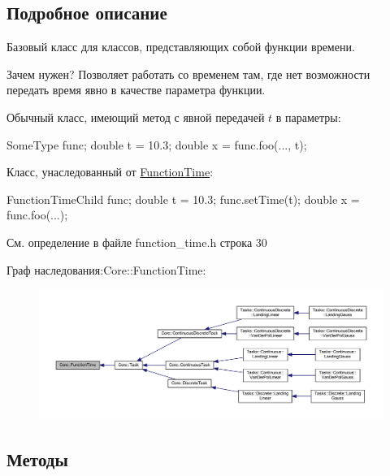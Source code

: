 \subsection{Подробное описание}
Базовый класс для классов, представляющих собой функции времени. 

Зачем нужен? Позволяет работать со временем там, где нет возможности передать время явно в качестве параметра функции.

Обычный класс, имеющий метод с явной передачей $t$ в параметры\+: 
\begin{DoxyCode}
SomeType func;
\textcolor{keywordtype}{double} t = 10.3;
\textcolor{keywordtype}{double} x = func.foo(..., t);
\end{DoxyCode}
 Класс, унаследованный от \hyperlink{class_core_1_1_function_time}{Function\+Time}\+: 
\begin{DoxyCode}
FunctionTimeChild func;
\textcolor{keywordtype}{double} t = 10.3;
func.setTime(t);
\textcolor{keywordtype}{double} x = func.foo(...);
\end{DoxyCode}
 

См. определение в файле function\+\_\+time.\+h строка 30



Граф наследования\+:Core\+:\+:Function\+Time\+:\nopagebreak
\begin{figure}[H]
\begin{center}
\leavevmode
\includegraphics[width=350pt]{class_core_1_1_function_time__inherit__graph}
\end{center}
\end{figure}


\subsection{Методы}
\hypertarget{class_core_1_1_function_time_a1f1674cdfd0a24f69934467369e30267}{}\label{class_core_1_1_function_time_a1f1674cdfd0a24f69934467369e30267} 
